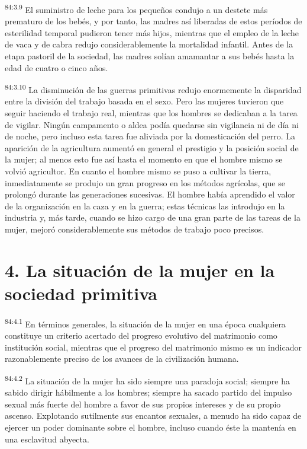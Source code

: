 \par
\textsuperscript{84:3.9} El suministro de leche para los pequeños condujo a un destete más prematuro de los bebés, y por tanto, las madres así liberadas de estos períodos de esterilidad temporal pudieron tener más hijos, mientras que el empleo de la leche de vaca y de cabra redujo considerablemente la mortalidad infantil. Antes de la etapa pastoril de la sociedad, las madres solían amamantar a sus bebés hasta la edad de cuatro o cinco años.

\par
\textsuperscript{84:3.10} La disminución de las guerras primitivas redujo enormemente la disparidad entre la división del trabajo basada en el sexo. Pero las mujeres tuvieron que seguir haciendo el trabajo real, mientras que los hombres se dedicaban a la tarea de vigilar. Ningún campamento o aldea podía quedarse sin vigilancia ni de día ni de noche, pero incluso esta tarea fue aliviada por la domesticación del perro. La aparición de la agricultura aumentó en general el prestigio y la posición social de la mujer; al menos esto fue así hasta el momento en que el hombre mismo se volvió agricultor. En cuanto el hombre mismo se puso a cultivar la tierra, inmediatamente se produjo un gran progreso en los métodos agrícolas, que se prolongó durante las generaciones sucesivas. El hombre había aprendido el valor de la organización en la caza y en la guerra; estas técnicas las introdujo en la industria y, más tarde, cuando se hizo cargo de una gran parte de las tareas de la mujer, mejoró considerablemente sus métodos de trabajo poco precisos.

\section*{4. La situación de la mujer en la sociedad primitiva}
\par
\textsuperscript{84:4.1} En términos generales, la situación de la mujer en una época cualquiera constituye un criterio acertado del progreso evolutivo del matrimonio como institución social, mientras que el progreso del matrimonio mismo es un indicador razonablemente preciso de los avances de la civilización humana.

\par
\textsuperscript{84:4.2} La situación de la mujer ha sido siempre una paradoja social; siempre ha sabido dirigir hábilmente a los hombres; siempre ha sacado partido del impulso sexual más fuerte del hombre a favor de sus propios intereses y de su propio ascenso. Explotando sutilmente sus encantos sexuales, a menudo ha sido capaz de ejercer un poder dominante sobre el hombre, incluso cuando éste la mantenía en una esclavitud abyecta.

